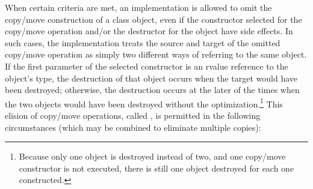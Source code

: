 \pnum
{}%
%
%
%
%
When certain criteria are met, an implementation is
allowed to omit the copy/move construction of a class object,
even if the constructor selected for the copy/move operation and/or the
destructor for the object have
%
side effects.  In such cases, the
implementation treats the source and target of the
omitted copy/move operation as simply two different ways of
referring to the same object. If the first parameter of the
selected constructor is an rvalue reference to the object's type,
the destruction of that object occurs when the target would have been destroyed;
otherwise, the destruction occurs at the later of the times when the
two objects would have been destroyed without the
optimization.\footnote{Because only one object is destroyed instead of two,
and one copy/move constructor
is not executed, there is still one object destroyed for each one constructed.}
This elision of copy/move operations, called
%
%
,
is permitted in the
following circumstances (which may be combined to
eliminate multiple copies):

